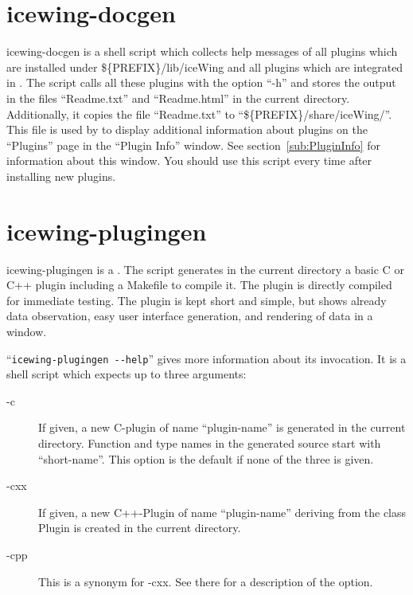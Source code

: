 \section{icewing-docgen}
\label{sec:icewing-docgen}

icewing-docgen is a shell script which collects help messages of all
plugins which are installed under \$\{PREFIX\}/lib/iceWing and all
plugins which are integrated in \icewing{}. The script calls all
these plugins with the option ``-h'' and stores the output in the
files ``Readme.txt'' and ``Readme.html'' in the current
directory. Additionally, it copies the file ``Readme.txt'' to
``\$\{PREFIX\}/share/iceWing/''. This file is
used by \icewing{} to display additional information about plugins
on the ``Plugins'' page in the ``Plugin Info'' window. See
section~\ref{sub:PluginInfo} for information about this window. You
should use this script every time after installing new plugins.

\section{icewing-plugingen}
\label{sec:icewing-plugingen}

icewing-plugingen is a . The script
generates in the current directory a basic C or C++ plugin including
a Makefile to compile it. The plugin is directly compiled for
immediate testing. The plugin is kept short and simple, but shows
already data observation, easy user interface generation, and
rendering of data in a window.

``\verb|icewing-plugingen --help|'' gives more information about its
invocation. It is a shell script which expects up to three
arguments:
\sS
{}
\begin{description}
\item[-c] If given, a new C-plugin of name ``plugin-name'' is
  generated in the current directory. Function and type names in the
  generated source start with ``short-name''. This option is the
  default if none of the three is given.
\item[-cxx] If given, a new C++-Plugin of name ``plugin-name''
  deriving from the class Plugin is created in the current
  directory. 
\item[-cpp] This is a synonym for -cxx. See there for a description
  of the option.
\end{description}

